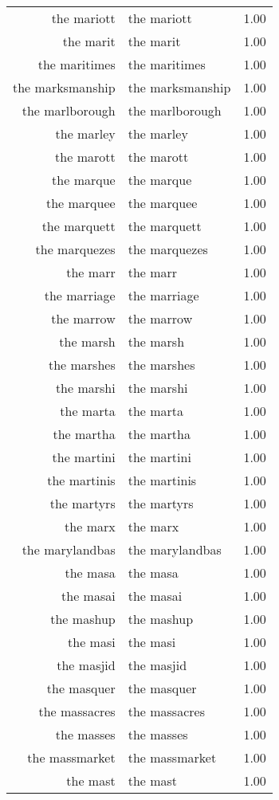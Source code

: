 \begin{table}[ht]
\begin{tabular}{rlr}
  the mariott & the mariott & 1.00 \\ 
  the marit & the marit & 1.00 \\ 
  the maritimes & the maritimes & 1.00 \\ 
  the marksmanship & the marksmanship & 1.00 \\ 
  the marlborough & the marlborough & 1.00 \\ 
  the marley & the marley & 1.00 \\ 
  the marott & the marott & 1.00 \\ 
  the marque & the marque & 1.00 \\ 
  the marquee & the marquee & 1.00 \\ 
  the marquett & the marquett & 1.00 \\ 
  the marquezes & the marquezes & 1.00 \\ 
  the marr & the marr & 1.00 \\ 
  the marriage & the marriage & 1.00 \\ 
  the marrow & the marrow & 1.00 \\ 
  the marsh & the marsh & 1.00 \\ 
  the marshes & the marshes & 1.00 \\ 
  the marshi & the marshi & 1.00 \\ 
  the marta & the marta & 1.00 \\ 
  the martha & the martha & 1.00 \\ 
  the martini & the martini & 1.00 \\ 
  the martinis & the martinis & 1.00 \\ 
  the martyrs & the martyrs & 1.00 \\ 
  the marx & the marx & 1.00 \\ 
  the marylandbas & the marylandbas & 1.00 \\ 
  the masa & the masa & 1.00 \\ 
  the masai & the masai & 1.00 \\ 
  the mashup & the mashup & 1.00 \\ 
  the masi & the masi & 1.00 \\ 
  the masjid & the masjid & 1.00 \\ 
  the masquer & the masquer & 1.00 \\ 
  the massacres & the massacres & 1.00 \\ 
  the masses & the masses & 1.00 \\ 
  the massmarket & the massmarket & 1.00 \\ 
  the mast & the mast & 1.00 \\ 

\end{tabular}
\end{table}

